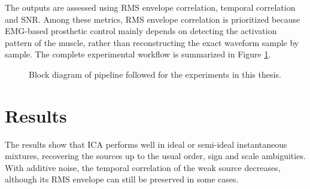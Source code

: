 The outputs are assessed using RMS envelope correlation, temporal correlation and SNR. Among these metrics, RMS envelope correlation is prioritized because EMG-based prosthetic control mainly depends on detecting the activation pattern of the muscle, rather than reconstructing the exact waveform sample by sample. The complete experimental workflow is summarized in Figure \ref{fig:methodoloy_pipeline1}.
\\
\begin{figure}[H]
    \centering
    \caption{Block diagram of pipeline followed for the experiments in this thesis.}
    \label{fig:methodoloy_pipeline1}
\end{figure}

\section*{Results}

The results show that ICA performs well in ideal or semi-ideal instantaneous mixtures, recovering the sources up to the usual order, sign and scale ambiguities. With additive noise, the temporal correlation of the weak source decreases, although its RMS envelope can still be preserved in some cases.


